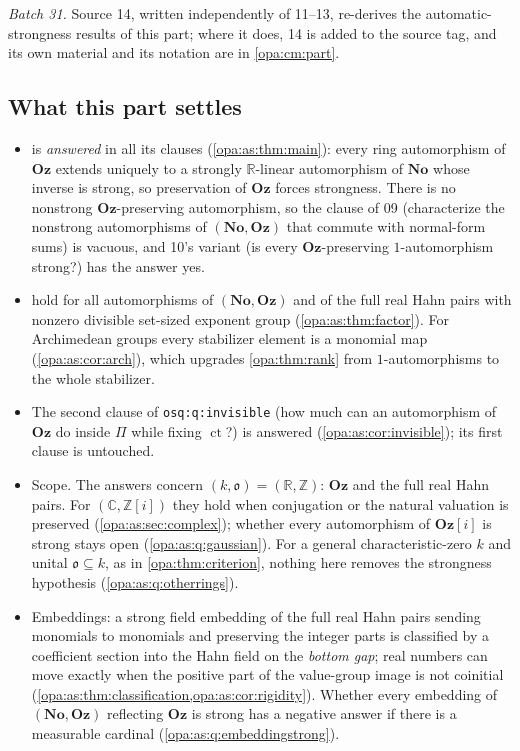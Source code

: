 \documentclass[11pt,oneside]{article}
\numberwithin{equation}{section}
\theoremstyle{definition}
\theoremstyle{remark}
\newcommand{\No}{\mathbf{No}}
\newcommand{\Oz}{\mathbf{Oz}}
\newcommand{\Og}{\mathbf{Oz}[i]}
\newcommand{\R}{\mathbb R}
\newcommand{\C}{\mathbb C}
\newcommand{\Z}{\mathbb Z}
\newcommand{\oo}{\mathfrak o}
\newcommand{\ct}{\operatorname{ct}}
\newcommand{\lbl}[1]{\nolinkurl{#1}}
\begin{document}
\emph{Batch 31.} Source 14, written independently of 11--13, re-derives the
automatic-strongness results of this part; where it does, 14 is added to the source
tag, and its own material and its notation are in \cref{opa:cm:part}.

\subsection{What this part settles}\label{opa:as:sub:settles}

\begin{itemize}[itemsep=2pt]
\item {} is \emph{answered} in all its clauses
(\cref{opa:as:thm:main}): every ring automorphism of $\Oz$ extends uniquely to a
strongly $\R$-linear automorphism of $\No$ whose inverse is strong, so preservation of
$\Oz$ forces strongness. There is no nonstrong $\Oz$-preserving automorphism, so the
clause of 09 (characterize the nonstrong automorphisms of $(\No,\Oz)$ that commute
with normal-form sums) is vacuous, and 10's variant (is every $\Oz$-preserving
$1$-automorphism strong?) has the answer yes.
\item {} hold for all automorphisms of
$(\No,\Oz)$ and of the full real Hahn pairs with nonzero divisible set-sized exponent
group (\cref{opa:as:thm:factor}). For Archimedean groups every stabilizer element is a
monomial map (\cref{opa:as:cor:arch}), which upgrades \cref{opa:thm:rank} from
$1$-automorphisms to the whole stabilizer.
\item The second clause of \lbl{osq:q:invisible} (how much can an automorphism of
$\Oz$ do inside $\Pi$ while fixing $\ct$?) is answered (\cref{opa:as:cor:invisible});
its first clause is untouched.
\item Scope. The answers concern $(k,\oo)=(\R,\Z)$: $\Oz$ and the full real Hahn pairs.
For $(\C,\Z[i])$ they hold when conjugation or the natural valuation is preserved
(\cref{opa:as:sec:complex}); whether every automorphism of $\Og$ is strong stays open
(\cref{opa:as:q:gaussian}). For a general characteristic-zero $k$ and unital
$\oo\subseteq k$, as in \cref{opa:thm:criterion}, nothing here removes the strongness
hypothesis (\cref{opa:as:q:otherrings}).
\item Embeddings: a strong field embedding of the full real Hahn pairs sending
monomials to monomials and preserving the integer parts is classified by a coefficient
section into the Hahn field on the \emph{bottom gap}; real numbers can move exactly
when the positive part of the value-group image is not coinitial
(\cref{opa:as:thm:classification,opa:as:cor:rigidity}). Whether every embedding of
$(\No,\Oz)$ reflecting $\Oz$ is strong has a negative answer if there is a measurable
cardinal (\cref{opa:as:q:embeddingstrong}).
\end{itemize}
\end{document}
